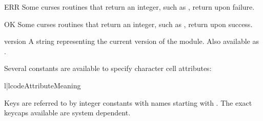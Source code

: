 \begin{datadesc}{ERR}
Some curses routines  that  return  an integer, such as 
, return  upon failure.  
\end{datadesc}

\begin{datadesc}{OK}
Some curses routines  that  return  an integer, such as 
, return  upon success.  
\end{datadesc}

\begin{datadesc}{version}
A string representing the current version of the module. 
Also available as .
\end{datadesc}

Several constants are available to specify character cell attributes:

\begin{tableii}{l|l}{code}{Attribute}{Meaning}
\end{tableii}

Keys are referred to by integer constants with names starting with 
.   The exact keycaps available are system dependent.


